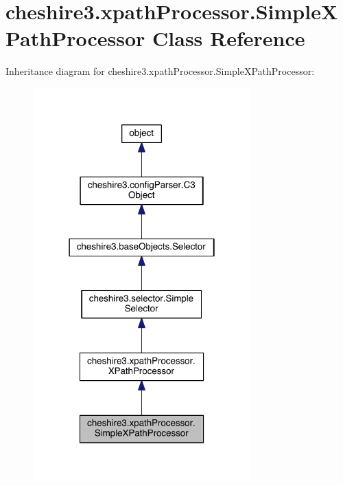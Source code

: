 \hypertarget{classcheshire3_1_1xpath_processor_1_1_simple_x_path_processor}{\section{cheshire3.\-xpath\-Processor.\-Simple\-X\-Path\-Processor Class Reference}
\label{classcheshire3_1_1xpath_processor_1_1_simple_x_path_processor}
}


Inheritance diagram for cheshire3.\-xpath\-Processor.\-Simple\-X\-Path\-Processor\-:
\nopagebreak
\begin{figure}[H]
\begin{center}
\leavevmode
\includegraphics[width=238pt]{classcheshire3_1_1xpath_processor_1_1_simple_x_path_processor__inherit__graph}
\end{center}
\end{figure}


